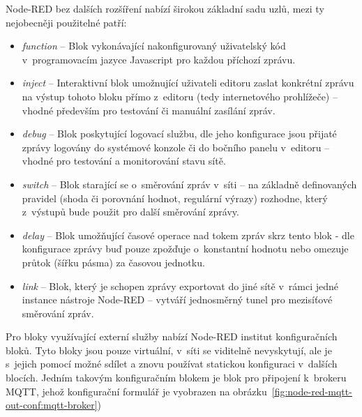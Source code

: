 Node-RED bez dalších rozšíření nabízí širokou základní sadu uzlů, mezi ty nejobecněji použitelné patří:

\begin{itemize}
    \item\emph{function} -- Blok vykonávající nakonfigurovaný uživatelský kód v~programovacím jazyce Javascript pro
    každou příchozí zprávu.
    \item\emph{inject} -- Interaktivní blok umožnující uživateli editoru zaslat konkrétní zprávu na výstup tohoto bloku
    přímo z~editoru (tedy internetového prohlížeče) -- vhodné především pro testování či manuální zasílání zpráv.
    \item\emph{debug} -- Blok poskytující logovací službu, dle jeho konfigurace jsou přijaté zprávy logovány do systémové konzole či do
    bočního panelu v~editoru -- vhodné pro testování a monitorování stavu sítě.
    \item\emph{switch} -- Blok starající se o~směrování zpráv v~síti -- na základně definovaných pravidel
    (shoda či porovnání hodnot, regulární výrazy) rozhodne, který z~výstupů bude použit pro další směrování zprávy.
    \item\emph{delay} -- Blok umožňující časové operace nad tokem zpráv skrz tento blok - dle konfigurace zprávy buď
    pouze zpožďuje o~konstantní hodnotu nebo omezuje průtok (šířku pásma) za časovou jednotku.
    \item\emph{link} -- Blok, který je schopen zprávy exportovat do jiné sítě v~rámci jedné instance nástroje
    Node-RED -- vytváří jednosměrný tunel pro mezisíťové směrování zpráv.
\end{itemize}

Pro bloky využívající externí služby nabízí Node-RED institut konfiguračních bloků.
Tyto bloky jsou pouze virtuální, v~síti se viditelně nevyskytují, ale je
s~jejich pomocí možné sdílet a znovu používat statickou konfiguraci v~dalších blocích.
Jedním takovým konfiguračním blokem je blok pro připojení k~brokeru MQTT, jehož konfigurační formulář je vyobrazen na
obrázku~\ref{fig:node-red-mqtt-out-conf:mqtt-broker})

